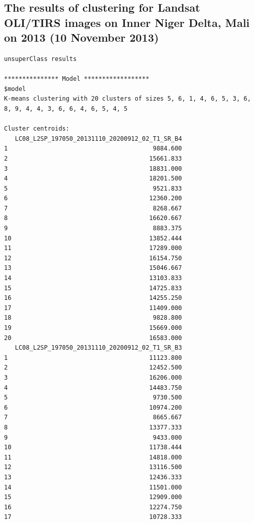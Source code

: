 \documentclass[12pt,a4paper,oneside]{article}
\begin{document}
\subsection*{The results of clustering for Landsat OLI/TIRS images on Inner Niger Delta, Mali on 2013 (10 November 2013)}
\begin{scriptsize}
\begin{verbatim}
unsuperClass results

*************** Model ******************
$model
K-means clustering with 20 clusters of sizes 5, 6, 1, 4, 6, 5, 3, 6, 8, 9, 4, 4, 3, 6, 6, 4, 6, 5, 4, 5

Cluster centroids:
   LC08_L2SP_197050_20131110_20200912_02_T1_SR_B4
1                                        9884.600
2                                       15661.833
3                                       18831.000
4                                       18201.500
5                                        9521.833
6                                       12360.200
7                                        8268.667
8                                       16620.667
9                                        8883.375
10                                      13852.444
11                                      17289.000
12                                      16154.750
13                                      15046.667
14                                      13103.833
15                                      14725.833
16                                      14255.250
17                                      11409.000
18                                       9828.800
19                                      15669.000
20                                      16583.000
   LC08_L2SP_197050_20131110_20200912_02_T1_SR_B3
1                                       11123.800
2                                       12452.500
3                                       16206.000
4                                       14483.750
5                                        9730.500
6                                       10974.200
7                                        8665.667
8                                       13377.333
9                                        9433.000
10                                      11738.444
11                                      14818.000
12                                      13116.500
13                                      12436.333
14                                      11501.000
15                                      12909.000
16                                      12274.750
17                                      10728.333

\end{verbatim}
\end{scriptsize}
\end{document}
